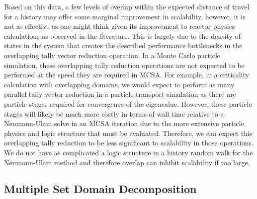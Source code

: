 Based on this data, a few levels of overlap within the expected
distance of travel for a history may offer some marginal improvement
in scalability, however, it is not as effective as one might think
given its improvement to reactor physics calculations as observed in
the literature. This is largely due to the density of states in the
system that creates the described performance bottlenecks in the
overlapping tally vector reduction operation. In a Monte Carlo
particle simulation, these overlapping tally reduction operations are
not expected to be performed at the speed they are required in
MCSA. For example, in a criticality calculation with overlapping
domains, we would expect to perform as many parallel tally vector
reduction in a particle transport simulation as there are particle
stages required for convergence of the eigenvalue. However, these
particle stages will likely be much more costly in terms of wall time
relative to a Neumann-Ulam solve in an MCSA iteration due to the more
extensive particle physics and logic structure that must be
evaluated. Therefore, we can expect this overlapping tally reduction
to be less significant to scalability in those operations. We do not
have as complicated a logic structure in a history random walk for the
Neumann-Ulam method and therefore overlap can inhibit scalability if
too large.

\clearpage

\subsection{Multiple Set Domain Decomposition}
\label{subsec:ms_decomposition}


